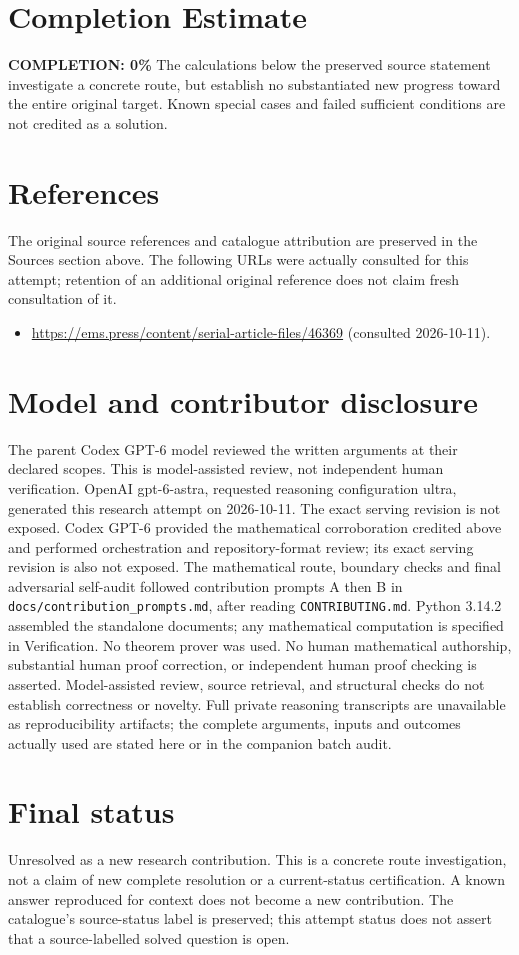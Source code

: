 \documentclass[11pt]{article}
\begin{document}
\section{Completion Estimate}
\noindent\textbf{COMPLETION: 0\%}
The calculations below the preserved source statement investigate a concrete route,
but establish no substantiated new progress toward the entire original target.
Known special cases and failed sufficient conditions are not credited as a solution.
\section{References}
The original source references and catalogue attribution are preserved in the
Sources section above. The following URLs were actually consulted for this attempt;
retention of an additional original reference does not claim fresh consultation of it.
\begin{itemize}
\item \url{https://ems.press/content/serial-article-files/46369} (consulted 2026-10-11). 
\end{itemize}
\section{Model and contributor disclosure}
The parent Codex GPT-6 model reviewed the written arguments at their declared scopes. This is model-assisted review, not independent human verification.
OpenAI gpt-6-astra, requested reasoning configuration ultra, generated this research
attempt on 2026-10-11. The exact serving revision is not exposed. Codex GPT-6
provided the mathematical corroboration credited above and performed orchestration and repository-format review; its exact serving revision
is also not exposed. The mathematical route, boundary checks and final adversarial
self-audit followed contribution prompts A then B in
\texttt{docs/contribution\_prompts.md}, after reading \texttt{CONTRIBUTING.md}.
Python 3.14.2 assembled the standalone documents; any mathematical computation is
specified in Verification. No theorem prover was used. No human mathematical
authorship, substantial human proof correction, or independent human proof checking
is asserted. Model-assisted review, source retrieval, and structural checks do not
establish correctness or novelty. Full private reasoning transcripts are unavailable
as reproducibility artifacts; the complete arguments, inputs and outcomes actually
used are stated here or in the companion batch audit.
\section{Final status}
Unresolved as a new research contribution. This is a concrete route investigation,
not a claim of new complete resolution or a current-status certification. A known
answer reproduced for context does not become a new contribution. The catalogue's
source-status label is preserved; this attempt status does not assert that a
source-labelled solved question is open.
\end{document}
